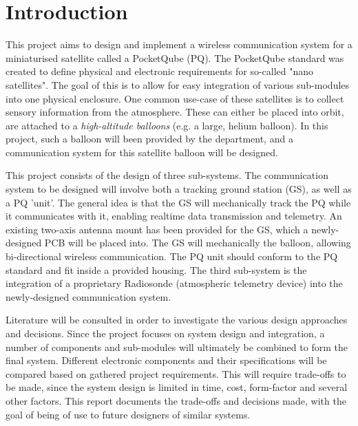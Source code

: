 \chapter{Introduction}

This project aims to design and implement a wireless communication system for a miniaturised satellite called a PocketQube (PQ). The PocketQube standard was created to define physical and electronic requirements for so-called "nano satellites". The goal of this is to allow for easy integration of various sub-modules into one physical enclosure. One common use-case of these satellites is to collect sensory information from the atmosphere. These can either be placed into orbit, are attached to a \textit{high-altitude balloons} (e.g. a large, helium balloon). In this project, such a balloon will been provided by the department, and a communication system for this satellite balloon will be designed.

This project consists of the design of three sub-systems. The communication system to be designed will involve both a tracking ground station (GS), as well as a PQ 'unit'. The general idea is that the GS will mechanically track the PQ while it communicates with it, enabling realtime data transmission and telemetry. An existing two-axis antenna mount has been provided for the GS, which a newly-designed PCB will be placed into. The GS will mechanically the balloon, allowing bi-directional wireless communication. The PQ unit should conform to the PQ standard and fit inside a provided housing. The third sub-system is the integration of a proprietary Radiosonde (atmospheric telemetry device) into the newly-designed communication system.

Literature will be consulted in order to investigate the various design approaches and decisions. Since the project focuses on system design and integration, a number of components and sub-modules will ultimately be combined to form the final system. Different electronic components and their specifications will be compared based on gathered project requirements. This will require trade-offs to be made, since the system design is limited in time, cost, form-factor and several other factors. This report documents the trade-offs and decisions made, with the goal of being of use to future designers of similar systems.